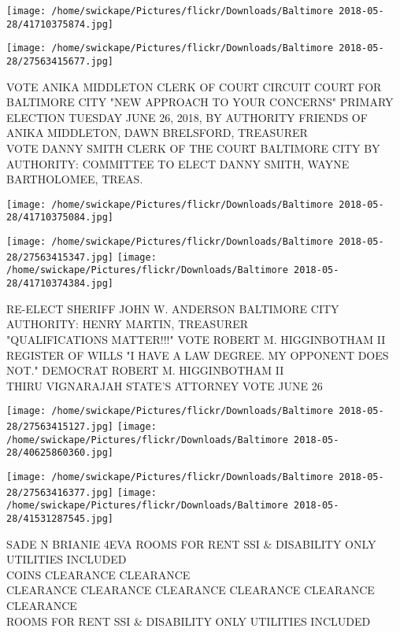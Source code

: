 \documentclass[10pt,letterpaper]{article}
\begin{document}
\texttt{[image: /home/swickape/Pictures/flickr/Downloads/Baltimore 2018-05-28/41710375874.jpg]}

\vspace{0.25in}
\texttt{[image: /home/swickape/Pictures/flickr/Downloads/Baltimore 2018-05-28/27563415677.jpg]}

VOTE ANIKA MIDDLETON CLERK OF COURT CIRCUIT COURT FOR BALTIMORE CITY "NEW APPROACH TO YOUR CONCERNS" PRIMARY ELECTION TUESDAY JUNE 26, 2018, BY AUTHORITY FRIENDS OF ANIKA MIDDLETON, DAWN BRELSFORD, TREASURER\\
VOTE DANNY SMITH CLERK OF THE COURT BALTIMORE CITY BY AUTHORITY: COMMITTEE TO ELECT DANNY SMITH, WAYNE BARTHOLOMEE, TREAS.\\
\pagebreak

\texttt{[image: /home/swickape/Pictures/flickr/Downloads/Baltimore 2018-05-28/41710375084.jpg]}

\vspace{0.25in}
\texttt{[image: /home/swickape/Pictures/flickr/Downloads/Baltimore 2018-05-28/27563415347.jpg]}
\texttt{[image: /home/swickape/Pictures/flickr/Downloads/Baltimore 2018-05-28/41710374384.jpg]}

RE{-}ELECT SHERIFF JOHN W. ANDERSON BALTIMORE CITY AUTHORITY: HENRY MARTIN, TREASURER\\
"QUALIFICATIONS MATTER!!!" VOTE ROBERT M. HIGGINBOTHAM II REGISTER OF WILLS "I HAVE A LAW DEGREE.  MY OPPONENT DOES NOT."  DEMOCRAT ROBERT M. HIGGINBOTHAM II\\
THIRU VIGNARAJAH STATE'S ATTORNEY VOTE JUNE 26\\
\pagebreak

\texttt{[image: /home/swickape/Pictures/flickr/Downloads/Baltimore 2018-05-28/27563415127.jpg]}
\texttt{[image: /home/swickape/Pictures/flickr/Downloads/Baltimore 2018-05-28/40625860360.jpg]}

\texttt{[image: /home/swickape/Pictures/flickr/Downloads/Baltimore 2018-05-28/27563416377.jpg]}
\texttt{[image: /home/swickape/Pictures/flickr/Downloads/Baltimore 2018-05-28/41531287545.jpg]}

SADE N BRIANIE 4EVA ROOMS FOR RENT SSI \& DISABILITY ONLY UTILITIES INCLUDED\\
COINS CLEARANCE CLEARANCE\\
CLEARANCE CLEARANCE CLEARANCE CLEARANCE CLEARANCE CLEARANCE\\
ROOMS FOR RENT SSI \& DISABILITY ONLY UTILITIES INCLUDED\\
\pagebreak
\end{document}
